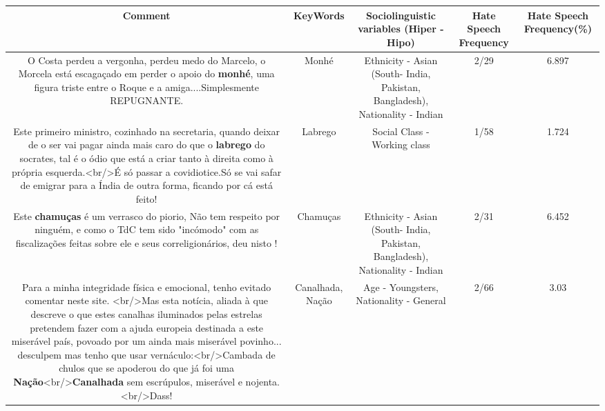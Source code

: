 \documentclass[11pt]{article}
\newlength\mylength
\begin{document}
\begin{center}
\setlength\mylength{\dimexpr\textwidth - 1\arrayrulewidth - 50\tabcolsep}
\begin{longtable}{|C{.65\mylength}|C{.30\mylength}|C{.12\mylength}|C{.12\mylength}|C{.12\mylength}|}
\hline
\textbf{Comment} & \textbf{KeyWords} & \textbf{Sociolinguistic variables (Hiper - Hipo)}  & \textbf{Hate Speech Frequency} & \textbf{Hate Speech Frequency(\%)} \\
\hline{}\small O Costa perdeu a vergonha, perdeu medo do Marcelo, o Morcela está escagaçado em perder o apoio do \textbf{m\textbf{onhé}}, uma figura triste entre o Roque e a amiga....Simplesmente REPUGNANTE.\normalsize   & Monhé & Ethnicity - Asian (South- India, Pakistan, Bangladesh), Nationality - Indian & 2/29 & 6.897 \\  \hline
  \small Este primeiro ministro, cozinhado na secretaria,  quando deixar de o ser vai pagar ainda mais caro do que o \textbf{labrego} do socrates, tal é o ódio que está a criar tanto à direita como à própria esquerda.<br/>É só passar a covidiotice.Só se vai safar de emigrar para a Índia de outra forma, ficando por cá está feito!\normalsize   & Labrego & Social Class - Working class & 1/58 & 1.724 \\  \hline
  \small Este \textbf{c\textbf{hamuças}} é um verrasco do piorio, Não tem respeito por ninguém, e como o TdC tem sido "incómodo" com as fiscalizações feitas sobre ele e seus correligionários, deu nisto !\normalsize   & Chamuças & Ethnicity - Asian (South- India, Pakistan, Bangladesh), Nationality - Indian & 2/31 & 6.452 \\  \hline
  \small Para a minha integridade física e emocional, tenho evitado comentar neste site.  <br/>Mas esta notícia, aliada à que descreve o que estes canalhas iluminados pelas estrelas pretendem fazer com a ajuda europeia destinada a este miserável país, povoado por um ainda mais miserável povinho... desculpem mas tenho que usar vernáculo:<br/>Cambada de chulos que se apoderou do que já foi uma \textbf{Nação}<br/>\textbf{Canalhada} sem escrúpulos, miserável e nojenta.<br/>Dass!\normalsize   & Canalhada, Nação & Age - Youngsters, Nationality - General & 2/66 & 3.03 \\  \hline

\end{longtable}
\end{center}
\end{document}
